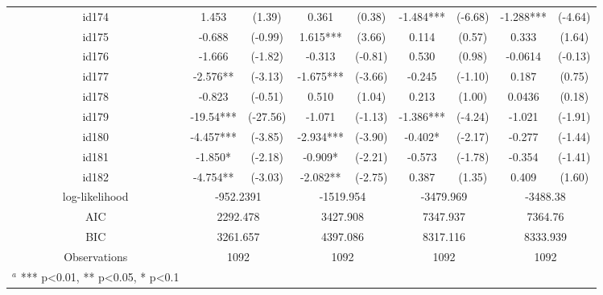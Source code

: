 \documentclass[entropy,article,submit,moreauthors,LaTeX and dvi2pdf]{Definitions/mdpi}
\begin{document}
\begin{center}
\begin{longtable}{ccccccccc}
id174                                         & 1.453         & (1.39)        & 0.361           & (0.38)           & -1.484***         & (-6.68)           & -1.288***         & (-4.64)           \\
id175                                         & -0.688        & (-0.99)       & 1.615***        & (3.66)           & 0.114             & (0.57)            & 0.333             & (1.64)            \\
id176                                         & -1.666        & (-1.82)       & -0.313          & (-0.81)          & 0.530             & (0.98)            & -0.0614           & (-0.13)           \\
id177                                         & -2.576**      & (-3.13)       & -1.675***       & (-3.66)          & -0.245            & (-1.10)           & 0.187             & (0.75)            \\
id178                                         & -0.823        & (-0.51)       & 0.510           & (1.04)           & 0.213             & (1.00)            & 0.0436            & (0.18)            \\
id179                                         & -19.54***     & (-27.56)      & -1.071          & (-1.13)          & -1.386***         & (-4.24)           & -1.021            & (-1.91)           \\
id180                                         & -4.457***     & (-3.85)       & -2.934***       & (-3.90)          & -0.402*           & (-2.17)           & -0.277            & (-1.44)           \\
id181                                         & -1.850*       & (-2.18)       & -0.909*         & (-2.21)          & -0.573            & (-1.78)           & -0.354            & (-1.41)           \\
id182                                         & -4.754**      & (-3.03)       & -2.082**        & (-2.75)          & 0.387             & (1.35)            & 0.409             & (1.60)            \\
log-likelihood     & \multicolumn{2}{c}{-952.2391} & \multicolumn{2}{c}{-1519.954}      & \multicolumn{2}{c}{-3479.969}         & \multicolumn{2}{c}{-3488.38}          \\
AIC                      & \multicolumn{2}{c}{2292.478}  & \multicolumn{2}{c}{3427.908}       & \multicolumn{2}{c}{7347.937}          & \multicolumn{2}{c}{7364.76}           \\
BIC                      & \multicolumn{2}{c}{3261.657}  & \multicolumn{2}{c}{4397.086}       & \multicolumn{2}{c}{8317.116}          & \multicolumn{2}{c}{8333.939}          \\
Observations             & \multicolumn{2}{c}{1092}     & \multicolumn{2}{c}{1092}          & \multicolumn{2}{c}{1092}             & \multicolumn{2}{c}{1092}\\
\bottomrule
\footnotesize{$^a$ *** p<0.01, ** p<0.05, * p<0.1}
\end{longtable}
\end{center}
\end{document}
